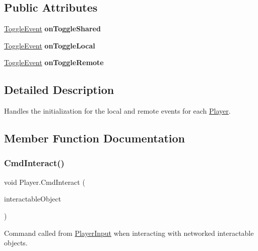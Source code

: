 \subsection*{Public Attributes}
\begin{DoxyCompactItemize}
\item 
\hypertarget{class_player_aa9a22d06500ffa2bbbf4551ec2607fda}{}\label{class_player_aa9a22d06500ffa2bbbf4551ec2607fda} 
\hyperlink{class_toggle_event}{Toggle\+Event} {\bfseries on\+Toggle\+Shared}
\item 
\hypertarget{class_player_a13b28f1c720ce94e6538073b1f7ba76f}{}\label{class_player_a13b28f1c720ce94e6538073b1f7ba76f} 
\hyperlink{class_toggle_event}{Toggle\+Event} {\bfseries on\+Toggle\+Local}
\item 
\hypertarget{class_player_a4c1150a5f09858ef98c5ff05e0e82d14}{}\label{class_player_a4c1150a5f09858ef98c5ff05e0e82d14} 
\hyperlink{class_toggle_event}{Toggle\+Event} {\bfseries on\+Toggle\+Remote}
\end{DoxyCompactItemize}


\subsection{Detailed Description}
Handles the initialization for the local and remote events for each \hyperlink{class_player}{Player}. 



\subsection{Member Function Documentation}
\hypertarget{class_player_a53cf43e4835276f4a24c3004b36265c7}{}\label{class_player_a53cf43e4835276f4a24c3004b36265c7} 
\subsubsection{\texorpdfstring{Cmd\+Interact()}{CmdInteract()}}
{\footnotesize\ttfamily void Player.\+Cmd\+Interact (\begin{DoxyParamCaption}\item[{Game\+Object}]{interactable\+Object }\end{DoxyParamCaption})}



Command called from \hyperlink{class_player_input}{Player\+Input} when interacting with networked interactable objects. 


